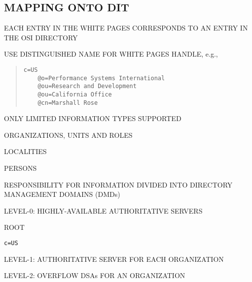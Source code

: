 \begin{bwslide}
\part*	{MAPPING ONTO DIT}\bf

\begin{nrtc}
\item	EACH ENTRY IN THE WHITE PAGES CORRESPONDS TO AN ENTRY IN THE OSI
	DIRECTORY

\item	USE DISTINGUISHED NAME FOR WHITE PAGES HANDLE, e.g.,
\begin{quote}\begin{verbatim}
c=US
    @o=Performance Systems International
    @ou=Research and Development
    @ou=California Office
    @cn=Marshall Rose
\end{verbatim}\end{quote}

\item	ONLY LIMITED INFORMATION TYPES SUPPORTED
    \begin{nrtc}
    \item	ORGANIZATIONS, UNITS AND ROLES

    \item	LOCALITIES

    \item	PERSONS
    \end{nrtc}
\end{nrtc}
\end{bwslide}


\begin{bwslide}

\begin{nrtc}
\item	RESPONSIBILITY FOR INFORMATION DIVIDED INTO DIRECTORY MANAGEMENT
	DOMAINS (DMDs)

\item	LEVEL-0: HIGHLY-AVAILABLE AUTHORITATIVE SERVERS
    \begin{nrtc}
    \item	ROOT

    \item	\verb"c=US"
    \end{nrtc}

\item	LEVEL-1: AUTHORITATIVE SERVER FOR EACH ORGANIZATION

\item	LEVEL-2: OVERFLOW DSAs FOR AN ORGANIZATION
\end{nrtc}
\end{bwslide}


